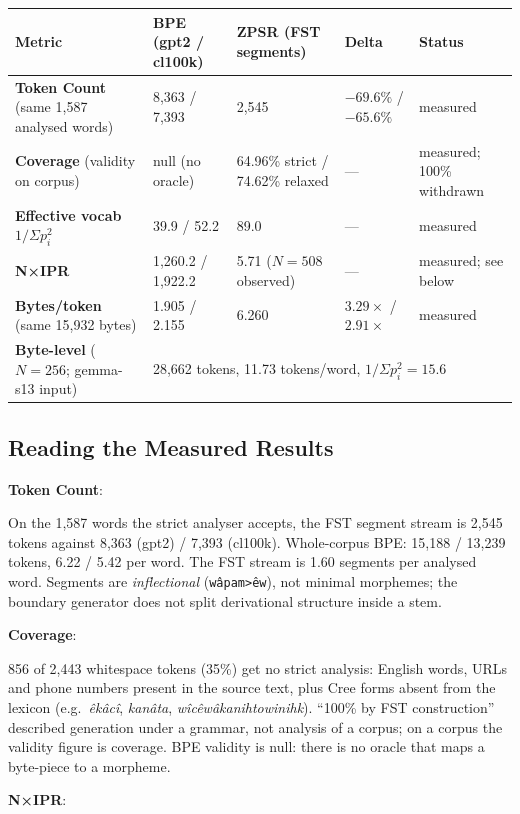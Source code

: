 \documentclass[11pt,oneside]{article}
\begin{document}
\begin{center}
\begin{tabular}{lllll}
\toprule
Metric & BPE (gpt2 / cl100k) & ZPSR (FST segments) & Delta & Status \\
\midrule
\textbf{Token Count} (same 1,587 analysed words) & 8,363 / 7,393 & 2,545 & $-69.6\%$ / $-65.6\%$ & measured \\
\textbf{Coverage} (validity on corpus) & null (no oracle) & 64.96\% strict / 74.62\% relaxed & --- & measured; 100\% withdrawn \\
\textbf{Effective vocab} $1/\Sigma p_i^2$ & 39.9 / 52.2 & 89.0 & --- & measured \\
\textbf{N×IPR} & 1,260.2 / 1,922.2 & 5.71 ($N{=}508$ observed) & --- & measured; see below \\
\textbf{Bytes/token} (same 15,932 bytes) & 1.905 / 2.155 & 6.260 & $3.29\times$ / $2.91\times$ & measured \\
\textbf{Byte-level} ($N{=}256$; gemma-s13 input) & \multicolumn{4}{l}{28,662 tokens, 11.73 tokens/word, $1/\Sigma p_i^2 = 15.6$} \\
\bottomrule
\end{tabular}
\end{center}

\subsection{Reading the Measured Results}

\textbf{Token Count}:

On the 1,587 words the strict analyser accepts, the FST segment stream is 2,545 tokens against 8,363 (gpt2) / 7,393 (cl100k). Whole-corpus BPE: 15,188 / 13,239 tokens, 6.22 / 5.42 per word. The FST stream is 1.60 segments per analysed word. Segments are \emph{inflectional} (\texttt{wâpam>êw}), not minimal morphemes; the boundary generator does not split derivational structure inside a stem.

\textbf{Coverage}:

856 of 2,443 whitespace tokens (35\%) get no strict analysis: English words, URLs and phone numbers present in the source text, plus Cree forms absent from the lexicon (e.g.\ \emph{êkâcî}, \emph{kanâta}, \emph{wîcêwâkanihtowinihk}). ``100\% by FST construction'' described generation under a grammar, not analysis of a corpus; on a corpus the validity figure is coverage. BPE validity is null: there is no oracle that maps a byte-piece to a morpheme.

\textbf{N×IPR}:
\end{document}
